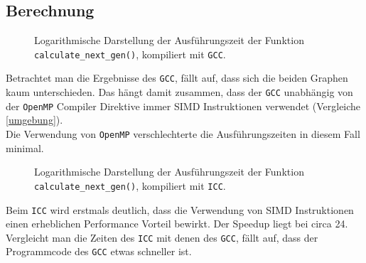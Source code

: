 \documentclass[german,plainarticle,hyperref,utf8]{zihpub}
\begin{document}
	\subsection{Berechnung}
	\begin{figure}[h]
		\centering
		
		\caption{Logarithmische Darstellung der Ausführungszeit der Funktion \texttt{calculate\_next\_gen()}, kompiliert mit \texttt{GCC}.}
	\end{figure}
	Betrachtet man die Ergebnisse des \texttt{GCC}, fällt auf, dass sich die beiden Graphen kaum unterschieden. Das hängt damit zusammen, dass der \texttt{GCC} unabhängig von der \texttt{OpenMP} Compiler Direktive immer SIMD Instruktionen verwendet (Vergleiche \ref{umgebung}).\\
	Die Verwendung von \texttt{OpenMP} verschlechterte die Ausführungszeiten in diesem Fall minimal.
	\clearpage
	\begin{figure}[h]
		\centering
		
		\caption{Logarithmische Darstellung der Ausführungszeit der Funktion \texttt{calculate\_next\_gen()}, kompiliert mit \texttt{ICC}.}
	\end{figure}
	Beim \texttt{ICC} wird erstmals deutlich, dass die Verwendung von SIMD Instruktionen einen erheblichen Performance Vorteil bewirkt. Der Speedup liegt bei circa 24.\\
	Vergleicht man die Zeiten des \texttt{ICC} mit denen des \texttt{GCC}, fällt auf, dass der Programmcode des \texttt{GCC} etwas schneller ist.
	\newpage
	\appendix
\end{document}
